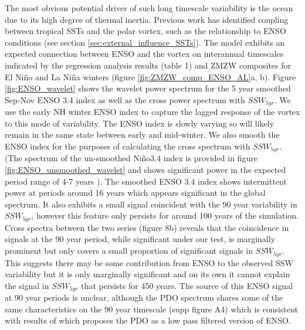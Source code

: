 The most obvious potential driver of such long timescale variability is the ocean due to its high degree of thermal inertia. Previous work has identified coupling between tropical SSTs and the polar vortex, such as the relationship to ENSO conditions (see section \ref{sec:external_influence_SSTs}). The model exhibits an expected connection between ENSO and the vortex on interannual timescales indicated by the regression analysis results (table 1) and ZMZW composites for El Ni\~{n}o and La Ni\~{n}a winters (figure \ref{fig:ZMZW_comp_ENSO_AL}a, b). Figure \ref{fig:ENSO_wavelet} shows the wavelet power spectrum for the 5 year smoothed Sep-Nov ENSO 3.4 index as well as the cross power spectrum with $SSW_{5yr}$. We use the early NH winter ENSO index to capture the lagged response of the vortex to this mode of variability. The ENSO index is slowly varying so will likely remain in the same state between early and mid-winter. We also smooth the ENSO index for the purposes of calculating the cross spectrum with $SSW_{5yr}$. (The spectrum of the un-smoothed Ni\~{n}o3.4 index is provided in figure \ref{fig:ENSO_unsmoothed_wavelet} and shows significant power in the expected period range of 4-7 years \citep{santosoDefining2017b}). The smoothed ENSO 3.4 index shows intermittent power at periods around 16 years which appears significant in the global spectrum. It also exhibits a small signal coincident with the 90 year variability in $SSW_{5yr}$, however this feature only persists for around 100 years of the simulation. Cross spectra between the two series (figure 8b) reveals that the coincidence in signals at the 90 year period, while significant under our test, is marginally prominent but only covers a small proportion of significant signals in $SSW_{5yr}$. This suggests there may be some contribution from ENSO to the observed SSW variability but it is only marginally significant and on its own it cannot explain the signal in $SSW_{5yr}$ that persists for 450 years. The source of this ENSO signal at 90 year periods is unclear, although the PDO spectrum shares some of the same characteristics on the 90 year timescale (supp figure A4) which is consistent with results of \cite{Newman2016} which proposes the PDO as a low pass filtered version of ENSO. 

